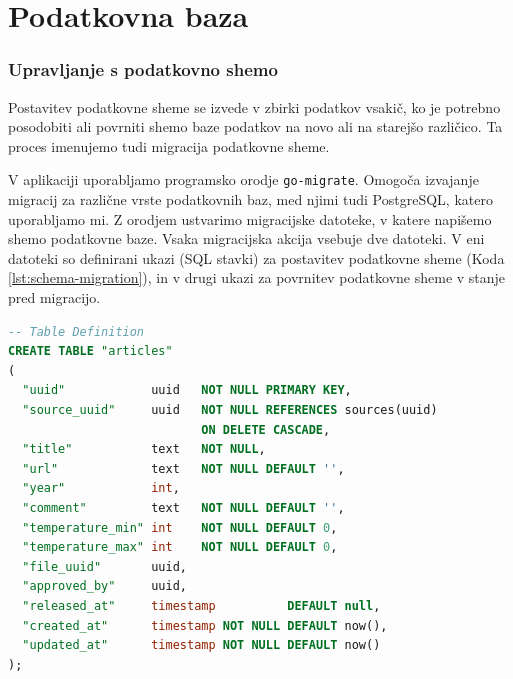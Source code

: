 \section{Podatkovna baza }

\subsubsection{Upravljanje s podatkovno shemo}
Postavitev podatkovne sheme se izvede v zbirki podatkov vsakič, ko je potrebno posodobiti ali povrniti shemo baze podatkov na novo ali na starejšo različico. Ta proces imenujemo tudi migracija podatkovne sheme.

V aplikaciji uporabljamo programsko orodje \verb=go-migrate=. Omogoča izvajanje migracij za različne vrste podatkovnih baz, med njimi tudi PostgreSQL, katero uporabljamo mi. Z orodjem ustvarimo migracijske datoteke, v katere napišemo shemo podatkovne baze. Vsaka migracijska akcija vsebuje dve datoteki. V eni datoteki so definirani ukazi (SQL stavki) za postavitev podatkovne sheme (Koda \ref{lst:schema-migration}), in v drugi ukazi za  povrnitev podatkovne sheme v stanje pred migracijo.


\begin{lstlisting}[language=sql, style=mystyle,caption={Izsek kode za kreiranje tabele $articles$, katere namenjen je hranjenje podatkov o publikacijah.},label=lst:schema-migration]
-- Table Definition
CREATE TABLE "articles"
(
  "uuid"            uuid   NOT NULL PRIMARY KEY,
  "source_uuid"     uuid   NOT NULL REFERENCES sources(uuid) 
                           ON DELETE CASCADE,
  "title"           text   NOT NULL,
  "url"             text   NOT NULL DEFAULT '',
  "year"            int,
  "comment"         text   NOT NULL DEFAULT '',
  "temperature_min" int    NOT NULL DEFAULT 0,
  "temperature_max" int    NOT NULL DEFAULT 0,
  "file_uuid"       uuid,
  "approved_by"     uuid,
  "released_at"     timestamp          DEFAULT null,
  "created_at"      timestamp NOT NULL DEFAULT now(),
  "updated_at"      timestamp NOT NULL DEFAULT now()
);
\end{lstlisting}

